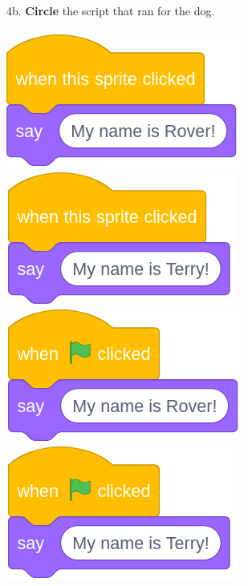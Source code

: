 \documentclass[letterpaper,12pt]{article}
\begin{document}
\noindent 4b. \textbf{Circle} the script that ran for the dog. \\ \\
\includegraphics[scale=.3,valign=t]{q4_script0.png} \hspace{1cm}
\includegraphics[scale=.3,valign=t]{q4_script1.png} \hspace{1cm}
\includegraphics[scale=.3,valign=t]{q4_script2.png} \hspace{1cm}
\includegraphics[scale=.3,valign=t]{q4_script3.png} \hspace{1cm}
\vspace{1cm}

\noindent \dotfill
\end{document}
